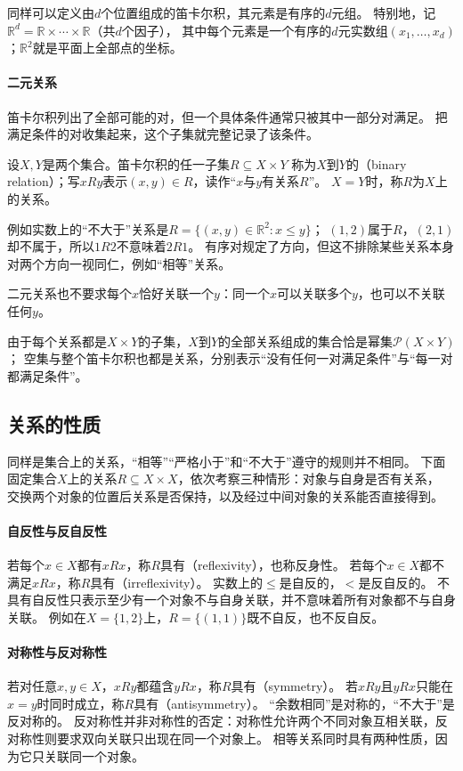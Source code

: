 同样可以定义由$d$个位置组成的笛卡尔积，其元素是有序的$d$元组。
特别地，记$\mathbb R^d=\mathbb R\times\cdots\times\mathbb R$（共$d$个因子），
其中每个元素是一个有序的$d$元实数组$(x_1,\ldots,x_d)$；$\mathbb R^2$就是平面上全部点的坐标。

\paragraph{二元关系}
笛卡尔积列出了全部可能的对，但一个具体条件通常只被其中一部分对满足。
把满足条件的对收集起来，这个子集就完整记录了该条件。

设$X,Y$是两个集合。笛卡尔积的任一子集$R\subseteq X\times Y$
称为$X$到$Y$的（binary relation）；写$xRy$表示$(x,y)\in R$，读作“$x$与$y$有关系$R$”。
$X=Y$时，称$R$为$X$上的关系。

例如实数上的“不大于”关系是$R=\{(x,y)\in\mathbb R^2:x\leq y\}$；
$(1,2)$属于$R$，$(2,1)$却不属于，所以$1R2$不意味着$2R1$。
有序对规定了方向，但这不排除某些关系本身对两个方向一视同仁，例如“相等”关系。

二元关系也不要求每个$x$恰好关联一个$y$：同一个$x$可以关联多个$y$，也可以不关联任何$y$。

由于每个关系都是$X\times Y$的子集，$X$到$Y$的全部关系组成的集合恰是幂集$\mathcal P(X\times Y)$；
空集与整个笛卡尔积也都是关系，分别表示“没有任何一对满足条件”与“每一对都满足条件”。

\subsection{关系的性质}
\label{sec:prelim-relation-properties}

同样是集合上的关系，“相等”“严格小于”和“不大于”遵守的规则并不相同。
下面固定集合$X$上的关系$R\subseteq X\times X$，依次考察三种情形：对象与自身是否有关系，
交换两个对象的位置后关系是否保持，以及经过中间对象的关系能否直接得到。

\paragraph{自反性与反自反性}
若每个$x\in X$都有$xRx$，称$R$具有（reflexivity），也称反身性。
若每个$x\in X$都不满足$xRx$，称$R$具有（irreflexivity）。
实数上的$\leq$是自反的，$<$是反自反的。
不具有自反性只表示至少有一个对象不与自身关联，并不意味着所有对象都不与自身关联。
例如在$X=\{1,2\}$上，$R=\{(1,1)\}$既不自反，也不反自反。

\paragraph{对称性与反对称性}
若对任意$x,y\in X$，$xRy$都蕴含$yRx$，称$R$具有（symmetry）。
若$xRy$且$yRx$只能在$x=y$时同时成立，称$R$具有（antisymmetry）。
“余数相同”是对称的，“不大于”是反对称的。
反对称性并非对称性的否定：对称性允许两个不同对象互相关联，反对称性则要求双向关联只出现在同一个对象上。
相等关系同时具有两种性质，因为它只关联同一个对象。

